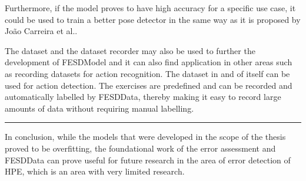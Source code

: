 Furthermore, if the model proves to have high accuracy for a specific use case, it could be used to train a better pose detector in the same way as it is proposed by Jo\~ao Carreira et al.\cite{IterativeErrorFeedback}.

The dataset and the dataset recorder may also be used to further the development of FESDModel and it can also find application in other areas such as recording datasets for action recognition. The dataset in and of itself can be used for action detection. The exercises are predefined and can be recorded and automatically labelled by FESDData, thereby making it easy to record large amounts of data without requiring manual labelling.

\noindent\rule[0.5pt]{\linewidth}{1pt}


In conclusion, while the models that were developed in the scope of the thesis proved to be overfitting, the foundational work of the error assessment and FESDData can prove useful for future research in the area of error detection of HPE, which is an area with very limited research.